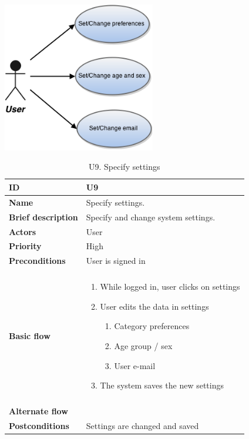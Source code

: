 \begin{table}[htp]
	\includegraphics[width=0.5\textwidth]{fig/U9}
	\centering
	\caption{U9. Specify settings}
	\begin{tabular}[b]{|l | l|}\hline
		\textbf{ID} 				& U9									\\\hline
		\textbf{Name} 				& Specify settings.						\\\hline
		\textbf{Brief description}	& Specify and change system settings. 	\\\hline
		\textbf{Actors} 			& User									\\\hline
		\textbf{Priority}			& High									\\\hline
		\textbf{Preconditions}		& User is signed in						\\\hline&\\[-2ex]
		\textbf{Basic flow}			& \begin{minipage}{5in}
			\begin{enumerate}[noitemsep]
				\item While logged in, user clicks on settings
				\item User edits the data in settings
					\begin{enumerate}
						\item Category preferences
						\item Age group / sex
						\item User e-mail
					\end{enumerate}
				\item The system saves the new settings
			\end{enumerate}						
		\end{minipage}						\\\hline&\\[-2ex]
		\textbf{Alternate flow}		& \begin{minipage}{5in}
		\end{minipage}							\\\hline
		\textbf{Postconditions}		& Settings are changed and saved\\\hline
	\end{tabular}
\end{table}


